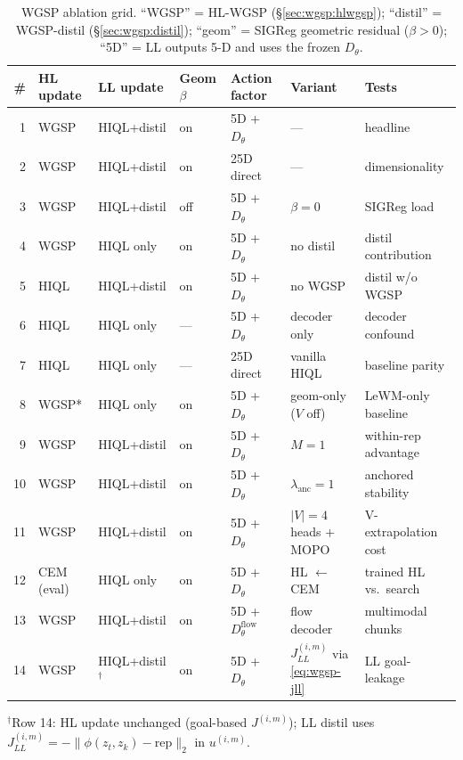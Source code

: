 \begin{table}[t]
\centering
\caption{WGSP ablation grid. ``WGSP'' = HL-WGSP (\S\ref{sec:wgsp:hlwgsp});
``distil'' = WGSP-distil (\S\ref{sec:wgsp:distil}); ``geom'' = SIGReg
geometric residual ($\beta>0$); ``5D'' = LL outputs 5-D and uses the
frozen $D_\theta$.}
\label{tab:wgsp-grid}
\begin{tabular}{rllllll}
\toprule
\# & HL update & LL update & Geom $\beta$ & Action factor & Variant & Tests\\
\midrule
1  & WGSP    & HIQL+distil & on  & 5D + $D_\theta$ & ---            & headline \\
2  & WGSP    & HIQL+distil & on  & 25D direct      & ---            & dimensionality \\
3  & WGSP    & HIQL+distil & off & 5D + $D_\theta$ & $\beta=0$      & SIGReg load \\
4  & WGSP    & HIQL only   & on  & 5D + $D_\theta$ & no distil      & distil contribution \\
5  & HIQL    & HIQL+distil & on  & 5D + $D_\theta$ & no WGSP        & distil w/o WGSP \\
6  & HIQL    & HIQL only   & --- & 5D + $D_\theta$ & decoder only   & decoder confound \\
7  & HIQL    & HIQL only   & --- & 25D direct      & vanilla HIQL   & baseline parity \\
8  & WGSP*   & HIQL only   & on  & 5D + $D_\theta$ & geom-only ($V$ off) & LeWM-only baseline \\
9  & WGSP    & HIQL+distil & on  & 5D + $D_\theta$ & $M=1$          & within-rep advantage \\
10 & WGSP    & HIQL+distil & on  & 5D + $D_\theta$ & $\lambda_\text{anc}=1$ & anchored stability \\
\midrule
11 & WGSP    & HIQL+distil & on  & 5D + $D_\theta$ & $|V|{=}4$ heads + MOPO & V-extrapolation cost \\
12 & CEM (eval) & HIQL only & on  & 5D + $D_\theta$ & HL $\leftarrow$ CEM & trained HL vs.\ search \\
13 & WGSP    & HIQL+distil & on  & 5D + $D^\text{flow}_\theta$ & flow decoder & multimodal chunks \\
14 & WGSP    & HIQL+distil$^\dagger$ & on & 5D + $D_\theta$ & $J_{LL}^{(i,m)}$ via \eqref{eq:wgsp-jll} & LL goal-leakage \\
\bottomrule
\end{tabular}
\par\smallskip
{\footnotesize $^\dagger$Row 14: HL update unchanged (goal-based $J^{(i,m)}$);
LL distil uses $J_{LL}^{(i,m)}=-\|\phi(z_t,z_k)-\text{rep}\|_2$ in $u^{(i,m)}$.}
\end{table}

